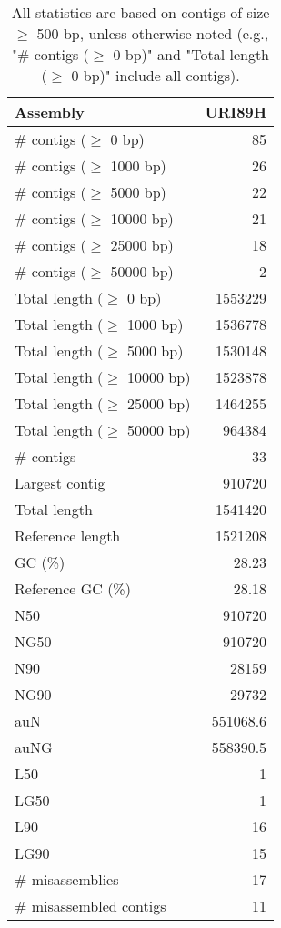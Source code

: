 \documentclass[12pt,a4paper]{article}
\begin{document}
\begin{table}[ht]
\begin{center}
\caption{All statistics are based on contigs of size $\geq$ 500 bp, unless otherwise noted (e.g., "\# contigs ($\geq$ 0 bp)" and "Total length ($\geq$ 0 bp)" include all contigs).}
\begin{tabular}{|l*{1}{|r}|}
\hline
Assembly & URI89H \\ \hline
\# contigs ($\geq$ 0 bp) & 85 \\ \hline
\# contigs ($\geq$ 1000 bp) & 26 \\ \hline
\# contigs ($\geq$ 5000 bp) & 22 \\ \hline
\# contigs ($\geq$ 10000 bp) & 21 \\ \hline
\# contigs ($\geq$ 25000 bp) & 18 \\ \hline
\# contigs ($\geq$ 50000 bp) & 2 \\ \hline
Total length ($\geq$ 0 bp) & 1553229 \\ \hline
Total length ($\geq$ 1000 bp) & 1536778 \\ \hline
Total length ($\geq$ 5000 bp) & 1530148 \\ \hline
Total length ($\geq$ 10000 bp) & 1523878 \\ \hline
Total length ($\geq$ 25000 bp) & 1464255 \\ \hline
Total length ($\geq$ 50000 bp) & 964384 \\ \hline
\# contigs & 33 \\ \hline
Largest contig & 910720 \\ \hline
Total length & 1541420 \\ \hline
Reference length & 1521208 \\ \hline
GC (\%) & 28.23 \\ \hline
Reference GC (\%) & 28.18 \\ \hline
N50 & 910720 \\ \hline
NG50 & 910720 \\ \hline
N90 & 28159 \\ \hline
NG90 & 29732 \\ \hline
auN & 551068.6 \\ \hline
auNG & 558390.5 \\ \hline
L50 & 1 \\ \hline
LG50 & 1 \\ \hline
L90 & 16 \\ \hline
LG90 & 15 \\ \hline
\# misassemblies & 17 \\ \hline
\# misassembled contigs & 11 \\ \hline

\end{tabular}
\end{center}
\end{table}
\end{document}
